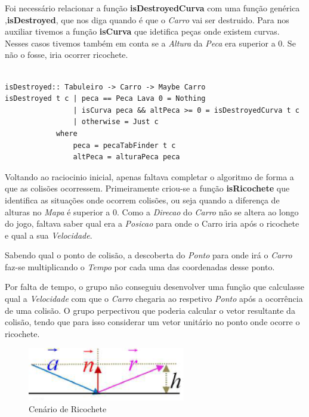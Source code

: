 \documentclass[a4paper]{report} %
\begin{document}
Foi necessário relacionar a função \textbf{isDestroyedCurva} com uma função genérica ,\textbf{isDestroyed}, que nos diga quando é que o \emph{Carro} vai ser destruido. Para nos auxiliar tivemos a função \textbf{isCurva} que idetifica peças onde existem curvas. Nesses casos tivemos também em conta se a \emph{Altura} da \emph{Peca} era superior a 0. Se não o fosse, iria ocorrer ricochete.


\begin{verbatim}

isDestroyed:: Tabuleiro -> Carro -> Maybe Carro
isDestroyed t c | peca == Peca Lava 0 = Nothing
                | isCurva peca && altPeca >= 0 = isDestroyedCurva t c 
                | otherwise = Just c
            where
                peca = pecaTabFinder t c
                altPeca = alturaPeca peca

\end{verbatim}

Voltando ao raciocinio inicial, apenas faltava completar o algoritmo de forma a que as colisões ocorressem. Primeiramente criou-se a função \textbf{isRicochete} que identifica as situações onde ocorrem colisões, ou seja quando a diferença de alturas no \emph{Mapa} é superior a 0. Como a \emph{Direcao} do \emph{Carro} não se altera ao longo do jogo, faltava saber qual era a \emph{Posicao} para onde o Carro iria após o ricochete e qual a sua \emph{Velocidade}.

Sabendo qual o ponto de colisão, a descoberta do \emph{Ponto} para onde irá o \emph{Carro} faz-se multiplicando o \emph{Tempo} por cada uma das coordenadas desse ponto. 

Por falta de tempo, o grupo não conseguiu desenvolver uma função que calculasse qual a \emph{Velocidade} com que o \emph{Carro} chegaria ao respetivo \emph{Ponto} após a ocorrência de uma colisão. O grupo perpectivou que poderia calcular o vetor resultante da colisão, tendo que para isso considerar um vetor unitário no ponto onde ocorre o ricochete.

\begin{figure} [!h]
    
    \centering
    \includegraphics[scale = 1.2]{Imagens/velocidadeR.png}
    \caption{Cenário de Ricochete}

\end{figure}
\end{document}
